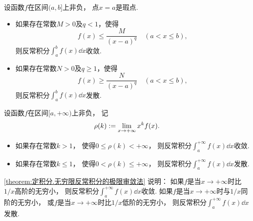 \begin{theorem}[比较审敛法2]\label{theorem:定积分.无界函数的反常积分的比较审敛法}
设函数\(f\)在区间\((a,b]\)上非负，
点\(x=a\)是瑕点.
\begin{itemize}
	\item 如果存在常数\(M > 0\)及\(q < 1\)，使得\[
		f(x) \leq \frac{M}{(x-a)^q}
		\quad(a < x \leq b),
	\]
	则反常积分\(\int_a^b f(x) \dd{x}\)收敛.
	\item 如果存在常数\(N > 0\)及\(q \geq 1\)，使得\[
		f(x) \geq \frac{N}{(x-a)^q}
		\quad(a < x \leq b),
	\]
	则反常积分\(\int_a^b f(x) \dd{x}\)发散.
\end{itemize}
\end{theorem}

\begin{theorem}[极限审敛法1]\label{theorem:定积分.无穷限反常积分的极限审敛法}
设函数\(f\)在区间\([a,+\infty)\)上非负，
记\[
	\rho(k) := \lim_{x\to+\infty} x^k f(x).
\]
\begin{itemize}
	\item 如果存在常数\(k > 1\)，
	使得\(0 \leq \rho(k) < +\infty\)，
	则反常积分\(\int_a^{+\infty} f(x) \dd{x}\)收敛.
	\item 如果存在常数\(k \leq 1\)，
	使得\(0 < \rho(k) \leq +\infty\)，
	则反常积分\(\int_a^{+\infty} f(x) \dd{x}\)发散.
\end{itemize}
\end{theorem}
\begin{remark}
\cref{theorem:定积分.无穷限反常积分的极限审敛法} 说明：
如果\(f\)是当\(x\to+\infty\)时比\(1/x\)高阶的无穷小，
则反常积分\(\int_a^{+\infty} f(x) \dd{x}\)收敛.
如果\(f\)是当\(x\to+\infty\)时与\(1/x\)同阶的无穷小，
或\(f\)是当\(x\to+\infty\)时比\(1/x\)低阶的无穷小，
则反常积分\(\int_a^{+\infty} f(x) \dd{x}\)发散.
\end{remark}

